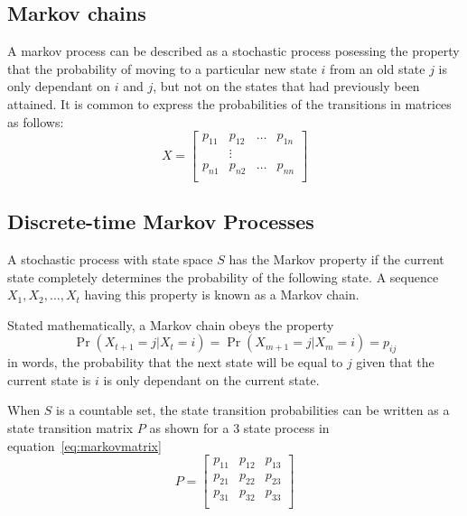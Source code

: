 \subsection{Markov chains}
A markov process can be described as a stochastic process posessing the
property that the probability of moving to a particular new state $i$ from an
old state $j$ is only dependant on $i$ and $j$, but not on the states that had
previously been attained.  It is common to express the probabilities of the
transitions in matrices as follows:
\begin{equation}
X = \left [ \begin{array}{cccc}
            p_{11} & p_{12}	& \ldots & p_{1n} \\
            & \vdots & \\
            p_{n1} & p_{n2} & \ldots & p_{nn}\\ 
            \end{array}\right]
\end{equation}

\subsection{Discrete-time Markov Processes}
A stochastic process with state space $S$ has the Markov
property if the current state completely determines the probability of
the following state.  A sequence $X_1,X_2, \dots ,X_t$ having this
property is known as a Markov chain.

Stated mathematically, a Markov chain obeys the property
\begin{equation}
  \label{eq:markovproperty}
  \Pr(X_{t+1} = j|X_{t}=i) = \Pr(X_{m+1}=j|X_{m}=i)=p_{ij}
\end{equation}
in words, the probability that the next state will be equal to $j$ given
that the current state is $i$ is only dependant on the current state.

When $S$ is a countable set, the state transition probabilities can be written 
as a state transition matrix $P$ as shown for a 3 state process in
equation~\ref{eq:markovmatrix}
\begin{equation}
\label{eq:markovmatrix}
P = \left[ 
  \begin{array}{cccc}
    p_{11} & p_{12} & p_{13}\\
    p_{21} & p_{22} & p_{23}\\
    p_{31} & p_{32} & p_{33}\\
  \end{array} \right ]
\end{equation}

